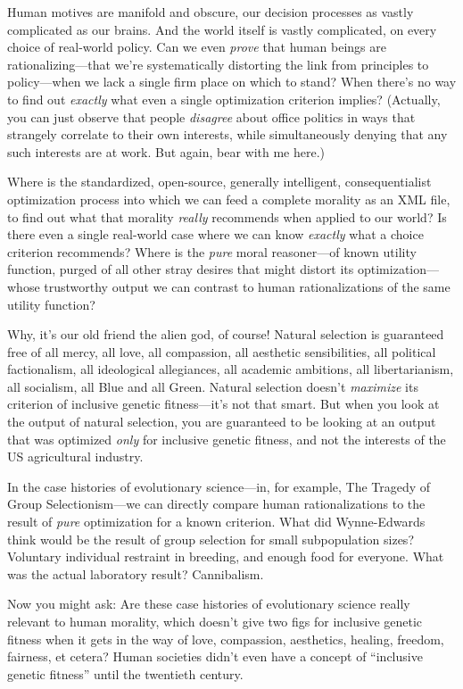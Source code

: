 {
 Human motives are manifold and obscure, our decision processes as
vastly complicated as our brains. And the world itself is vastly
complicated, on every choice of real-world policy. Can we even
\textit{prove} that human beings are rationalizing---that
we're systematically distorting the link from
principles to policy---when we lack a single firm place on which to
stand? When there's no way to find out \textit{exactly}
what even a single optimization criterion implies? (Actually, you can
just observe that people \textit{disagree} about office politics in
ways that strangely correlate to their own interests, while
simultaneously denying that any such interests are at work. But again,
bear with me here.)}

{
 Where is the standardized, open-source, generally intelligent,
consequentialist optimization process into which we can feed a complete
morality as an XML file, to find out what that morality \textit{really}
recommends when applied to our world? Is there even a single real-world
case where we can know \textit{exactly} what a choice criterion
recommends? Where is the \textit{pure} moral reasoner---of known
utility function, purged of all other stray desires that might distort
its optimization---whose trustworthy output we can contrast to human
rationalizations of the same utility function?}

{
 Why, it's our old friend the alien god, of course!
Natural selection is guaranteed free of all mercy, all love, all
compassion, all aesthetic sensibilities, all political factionalism,
all ideological allegiances, all academic ambitions, all
libertarianism, all socialism, all Blue and all Green. Natural
selection doesn't \textit{maximize} its criterion of
inclusive genetic fitness---it's not that smart. But
when you look at the output of natural selection, you are guaranteed to
be looking at an output that was optimized \textit{only} for inclusive
genetic fitness, and not the interests of the US agricultural
industry.}

{
 In the case histories of evolutionary science---in, for example,
The Tragedy of Group Selectionism---we can directly compare human
rationalizations to the result of \textit{pure} optimization for a
known criterion. What did Wynne-Edwards think would be the result of
group selection for small subpopulation sizes? Voluntary individual
restraint in breeding, and enough food for everyone. What was the
actual laboratory result? Cannibalism.}

{
 Now you might ask: Are these case histories of evolutionary
science really relevant to human morality, which
doesn't give two figs for inclusive genetic fitness
when it gets in the way of love, compassion, aesthetics, healing,
freedom, fairness, et cetera? Human societies didn't
even have a concept of ``inclusive genetic
fitness'' until the twentieth century.}

